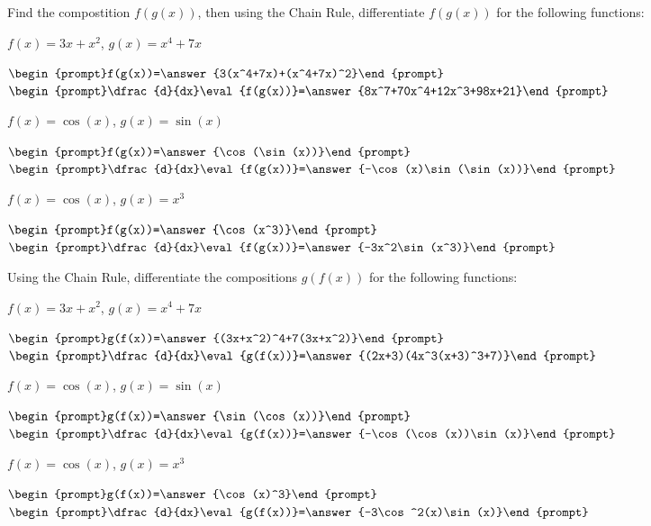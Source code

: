 \documentclass{ximera}
\begin{document}
\begin{question}

Find the compostition $f(g(x))$, then using the Chain Rule, differentiate $f(g(x))$ for the following functions:

$f(x) = 3x+x^2$, $g(x) = x^4+7x$

$\begin{prompt}f(g(x))=\answer{3(x^4+7x)+(x^4+7x)^2}\end{prompt}$
$\begin{prompt}\dfrac{d}{dx}\eval{f(g(x))}=\answer{8x^7+70x^4+12x^3+98x+21}\end{prompt}$

$f(x) = \cos(x)$, $g(x) = \sin(x)$

$\begin{prompt}f(g(x))=\answer{\cos(\sin(x))}\end{prompt}$
$\begin{prompt}\dfrac{d}{dx}\eval{f(g(x))}=\answer{-\cos(x)\sin(\sin(x))}\end{prompt}$

$f(x) = \cos(x)$, $g(x) = x^3$

$\begin{prompt}f(g(x))=\answer{\cos(x^3)}\end{prompt}$
$\begin{prompt}\dfrac{d}{dx}\eval{f(g(x))}=\answer{-3x^2\sin(x^3)}\end{prompt}$

\end{question}

\begin{question}

Using the Chain Rule, differentiate the compositions $g(f(x))$ for the following functions:

$f(x) = 3x+x^2$, $g(x) = x^4+7x$

$\begin{prompt}g(f(x))=\answer{(3x+x^2)^4+7(3x+x^2)}\end{prompt}$
$\begin{prompt}\dfrac{d}{dx}\eval{g(f(x))}=\answer{(2x+3)(4x^3(x+3)^3+7)}\end{prompt}$

$f(x) = \cos(x)$, $g(x) = \sin(x)$

$\begin{prompt}g(f(x))=\answer{\sin(\cos(x))}\end{prompt}$
$\begin{prompt}\dfrac{d}{dx}\eval{g(f(x))}=\answer{-\cos(\cos(x))\sin(x)}\end{prompt}$

$f(x) = \cos(x)$, $g(x) = x^3$

$\begin{prompt}g(f(x))=\answer{\cos(x)^3}\end{prompt}$
$\begin{prompt}\dfrac{d}{dx}\eval{g(f(x))}=\answer{-3\cos^2(x)\sin(x)}\end{prompt}$

\end{question}
\end{document}
